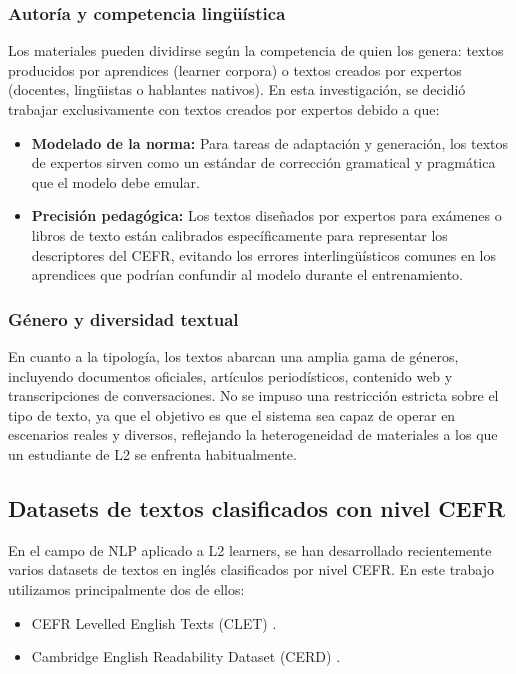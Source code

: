 \subsubsection{Autoría y competencia lingüística}
Los materiales pueden dividirse según la competencia de quien los genera: textos producidos por aprendices (learner corpora) o textos creados por expertos (docentes, lingüistas o hablantes nativos). En esta investigación, se decidió trabajar exclusivamente con textos creados por expertos debido a que:

\begin{itemize}
    \item \textbf {Modelado de la norma:} Para tareas de adaptación y generación, los textos de expertos sirven como un estándar de corrección gramatical y pragmática que el modelo debe emular.
    \item \textbf {Precisión pedagógica:} Los textos diseñados por expertos para exámenes o libros de texto están calibrados específicamente para representar los descriptores del CEFR, evitando los errores interlingüísticos comunes en los aprendices que podrían confundir al modelo durante el entrenamiento.
\end{itemize}

\subsubsection{Género y diversidad textual}
En cuanto a la tipología, los textos abarcan una amplia gama de géneros, incluyendo documentos oficiales, artículos periodísticos, contenido web y transcripciones de conversaciones. No se impuso una restricción estricta sobre el tipo de texto, ya que el objetivo es que el sistema sea capaz de operar en escenarios reales y diversos, reflejando la heterogeneidad de materiales a los que un estudiante de L2 se enfrenta habitualmente.


\subsection{Datasets de textos clasificados con nivel CEFR}\label{subsection:datasets}
En el campo de NLP aplicado a L2 learners, se han desarrollado recientemente varios datasets de textos en inglés clasificados por nivel CEFR. En este trabajo utilizamos principalmente dos de ellos:
\begin{itemize}
    \item CEFR Levelled English Texts (CLET) \cite{kagle}.
    \item Cambridge English Readability Dataset (CERD) \cite{Imperial2025}.
\end{itemize}

